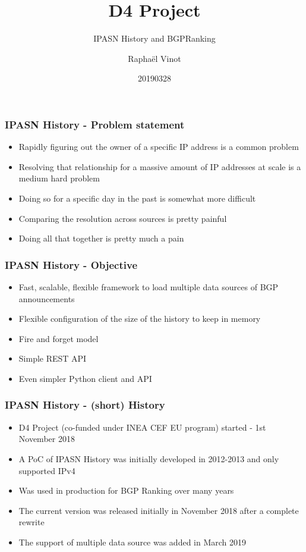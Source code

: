 \documentclass{beamer}
\title{D4 Project}
\subtitle{IPASN History and BGPRanking}
\author{Raphaël Vinot}
\institute{Team CIRCL \\ \url{https://www.d4-project.org/}}
\date{20190328}
\begin{document}
    \begin{frame}
        \maketitle
    \end{frame}

\begin{frame}
    \frametitle{IPASN History - Problem statement}
    \begin{itemize}
        \item Rapidly figuring out the owner of a specific IP address is a common problem
        \item Resolving that relationship for a massive amount of IP addresses at scale is a medium hard problem
        \item Doing so for a specific day in the past is somewhat more difficult
        \item Comparing the resolution across sources is pretty painful
        \item Doing all that together is pretty much a pain
    \end{itemize}
\end{frame}


\begin{frame}
 \frametitle{IPASN History - Objective}
 \begin{itemize}
         \item Fast, scalable, flexible framework to load multiple data sources of BGP announcements
         \item Flexible configuration of the size of the history to keep in memory
         \item Fire and forget model
         \item Simple REST API
         \item Even simpler Python client and API
 \end{itemize}
\end{frame}

\begin{frame}
        \frametitle{IPASN History - (short) History}
 \begin{itemize}
        \item D4 Project (co-funded under INEA CEF EU program) started - 1st November 2018
        \item A PoC of IPASN History was initially developed in 2012-2013 and only supported IPv4
        \item Was used in production for BGP Ranking over many years
        \item The current version was released initially in November 2018 after a complete rewrite
        \item The support of multiple data source was added in March 2019
 \end{itemize}
\end{frame}
\end{document}

